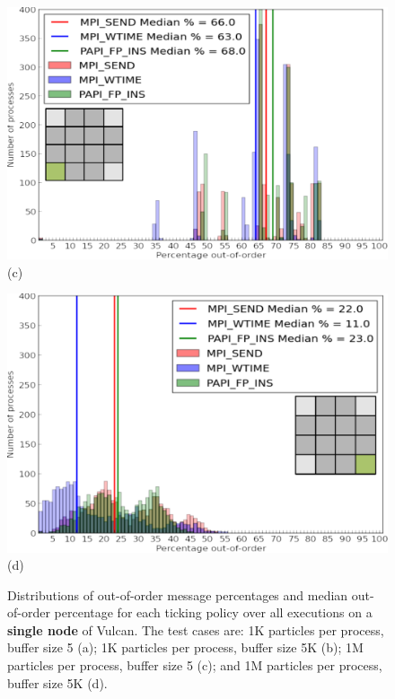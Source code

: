 \begin{figure}[!htb]
\begin{minipage}[b]{0.5\linewidth}
        \includegraphics[width=0.95\linewidth]{chapter_3_figures/hist_nodes1_procs16_particles1000000_cycles10_bufferSize5.pdf}
        \\ (c) \\
    \end{minipage}
    \begin{minipage}[b]{0.5\linewidth}
        \centering
        \includegraphics[width=0.95\linewidth]{chapter_3_figures/hist_nodes1_procs16_particles1000000_cycles10_bufferSize5000.pdf}
       \\ (d) \\
    \end{minipage}
    \caption{Distributions of out-of-order message percentages and
      median out-of-order percentage for each ticking policy over all
      executions on a \textbf{single node} of Vulcan. 
      The test cases are: 
      1K particles per process, buffer size 5 (a); 
      1K particles per process, buffer size 5K (b);
      1M particles per process, buffer size 5 (c);
      and 1M particles per process, buffer size 5K (d).}
    \label{fig:resutls1}
\end{figure}
